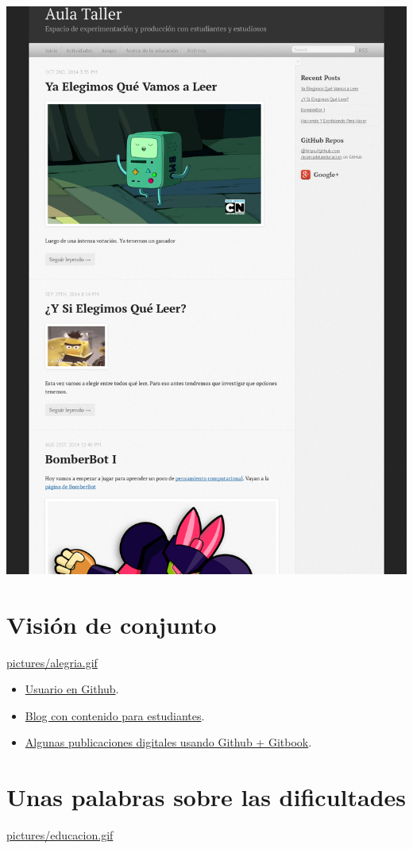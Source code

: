 \documentclass[11pt]{article}
\begin{document}
\includegraphics[width=.9\linewidth]{pictures/plani2.png}

\section{Visión de conjunto}
\label{sec:orgheadline10}
\url{pictures/alegria.gif}

\begin{itemize}
\item \href{https://github.com/alvarmaciel}{Usuario en Github}.
\item \href{http://acercadelaeducacion.github.io/aulataller}{Blog con contenido para estudiantes}.
\item \href{https://www.gitbook.io/@alvarmaciel}{Algunas publicaciones digitales usando Github + Gitbook}.
\end{itemize}
\section{Unas palabras sobre las dificultades}
\label{sec:orgheadline11}
\url{pictures/educacion.gif}
\end{document}
